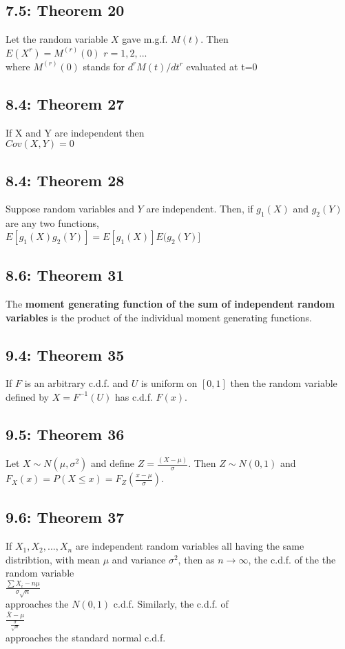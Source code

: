 \documentclass[11pt]{article}
\begin{document}
	\subsection*{7.5: Theorem 20}
		Let the random variable $X$ gave m.g.f. $M(t)$. Then\\
		$ E(X^r)=M^{(r)}(0)$   $r=1,2,...$\\
		where $M^{(r)}(0)$ stands for $d^rM(t)/dt^r$ evaluated at t=0\\
		
	\subsection*{8.4: Theorem 27}
	If X and Y are independent then\\
	 $Cov(X,Y)=0$\\
	\subsection*{8.4: Theorem 28}
		Suppose random variables  and $Y$ are independent. Then, if $g_1(X)$ and $g_2(Y)$ are any two functions,\\
	$E[g_1(X)g_2(Y)] = E[g_1(X)]E(g_2(Y)]$	
	
	\subsection*{8.6: Theorem 31}
		The {\bf moment generating function of the sum of independent random variables} is the product of the individual moment generating functions.
		
	\subsection*{9.4: Theorem 35}
		If $F$ is an arbitrary c.d.f. and $U$ is uniform on $[0,1]$ then the random variable defined by $X=F^{-1}(U)$ has c.d.f. $F(x)$.
	
	\subsection*{9.5: Theorem 36}
		Let $X \sim N(\mu,\sigma^2)$ and define $Z=\frac{(X-\mu)}{\sigma}$. Then $Z\sim N(0,1)$ and\\
		$F_X(x)=P(X\leq x) = F_Z(\frac{x-\mu}{\sigma})$.
	
	\subsection*{9.6: Theorem 37}
		If $X_1,X_2,...,X_n$ are independent random variables all having the same distribtion, with mean $\mu$ and variance $\sigma^2$, then as $n \rightarrow \infty$, the c.d.f. of the the random variable \\
		$\frac{\sum X_i-n\mu}{\sigma\sqrt{n}}$\\
		approaches the $N(0,1)$ c.d.f. Similarly, the c.d.f. of\\
		$\frac{\overline{X}-\mu}{\frac{\sigma}{\sqrt{n}}}$\\
		approaches the standard normal c.d.f.
	
\end{document}
